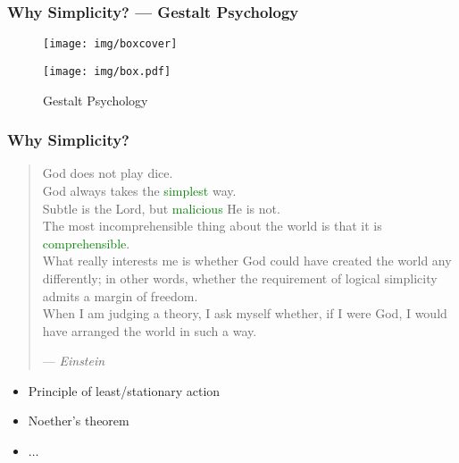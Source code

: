 \documentclass[UTF8,11pt,colorlinks,compress,openany]{beamer}%
\begin{document}
\begin{frame}\frametitle{Why Simplicity? --- Gestalt Psychology}
	\begin{center}
		\begin{figure}
		\texttt{[image: img/boxcover]}
		\end{figure}
		\begin{figure}
			\texttt{[image: img/box.pdf]}\caption{Gestalt Psychology}
		\end{figure}
	\end{center}
\end{frame}

\begin{frame}\frametitle{Why Simplicity?}
	\begin{quote}
		God does not play dice.\\
		God always takes the \textcolor{green}{simplest} way.\\
		Subtle is the Lord, but \textcolor{green}{malicious} He is not.\\
		The most incomprehensible thing about the world is that it is \textcolor{green}{comprehensible}.\\
		What really interests me is whether God could have created the world any differently; in other words, whether the requirement of logical simplicity admits a margin of freedom.\\
		When I am judging a theory, I ask myself whether, if I were God, I would have arranged the
		world in such a way. \par\hfill --- \textsl{Einstein}
	\end{quote}
	\begin{itemize}
		\item Principle of least/stationary action
		\item Noether's theorem
		\item $\dots$
	\end{itemize}
\end{frame}
\end{document}

